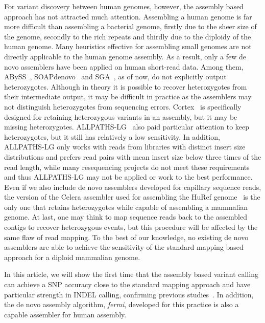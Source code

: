 \documentclass{bioinfo}
\begin{document}
For variant discovery between human genomes, however, the assembly based
approach has not attracted much attention. Assembling a human genome is far
more difficult than assembling a bacterial genome, firstly due to the sheer
size of the genome, secondly to the rich repeats and thirdly due to the
diploidy of the human genome. Many heuristics effective for assembling small
genomes are not directly applicable to the human genome assembly. As a result,
only a few de novo assemblers have been applied on human short-read data. Among
them, ABySS~\citep{Simpson:2009ys}, SOAPdenovo~\citep{Li:2010vn} and
SGA~\citep{Simpson:2011ly}, as of now, do not explicitly output heterozygotes.
Although in theory it is possible to recover heterozygotes from their
intermediate output, it may be difficult in practice as the assemblers may not
distinguish heterozygotes from sequencing errors. Cortex~\citep{Iqbal:2012ys}
is specifically designed for retaining heterozygous variants in an assembly,
but it may be missing heterozygotes. ALLPATHS-LG~\citep{Gnerre:2011ys}
also paid particular attention to keep heterozygotes, but it still has
relatively a low sensitivity. In addition, ALLPATHS-LG only works with
reads from libraries with distinct insert size distributions and prefers read
pairs with mean insert size below three times of the read length, while many
resequencing projects do not meet these requirements and thus ALLPATHS-LG may
not be applied or work to the best performance. Even if we also include de novo
assemblers developed for capillary sequence reads, the version of the Celera
assembler used for assembling the HuRef genome~\citep{Levy:2007uq} is the only
one that retains heterozygotes while capable of assembling a mammalian genome.
At last, one may think to map sequence reads back to the assembled contigs to
recover heterozygous events, but this
procedure will be affected by the same flaw of read mapping. To the best of our
knowledge, no existing de novo assemblers are able to achieve the sensitivity
of the standard mapping based approach for a diploid mammalian genome.

In this article, we will show the first time that the assembly based variant
calling can achieve a SNP accuracy close to the standard mapping approach
and have particular strength in INDEL calling, confirming previous
studies~\citep{Iqbal:2012ys}. In addition, the de novo assembly
algorithm, \emph{fermi}, developed for this practice is also a capable
assembler for human assembly.
\end{document}
